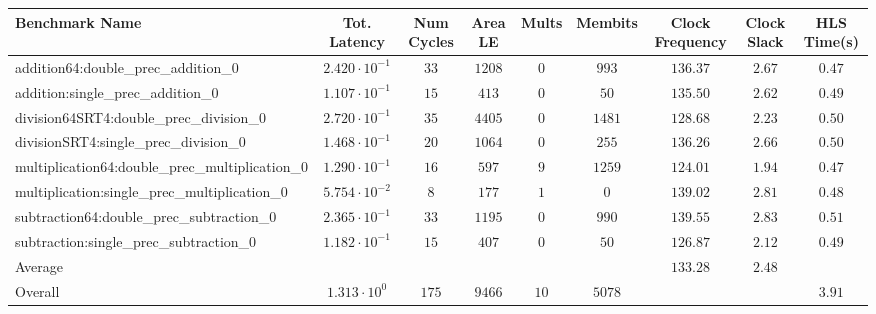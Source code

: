 \begin{tabular}{|l|c|c|c|c|c|c|c|c|}
\hline
Benchmark Name                                   & Tot. Latency            & Num Cycles & Area LE  & Mults  & Membits  & Clock Frequency & Clock Slack & HLS Time(s) \\
\hline
addition64:double\_prec\_addition\_0             & $ 2.420 \cdot 10^{-1} $ & $ 33     $ & $ 1208 $ & $ 0  $ & $ 993  $ & $ 136.37      $ & $ 2.67    $ & $ 0.47    $ \\
addition:single\_prec\_addition\_0               & $ 1.107 \cdot 10^{-1} $ & $ 15     $ & $ 413  $ & $ 0  $ & $ 50   $ & $ 135.50      $ & $ 2.62    $ & $ 0.49    $ \\
division64SRT4:double\_prec\_division\_0         & $ 2.720 \cdot 10^{-1} $ & $ 35     $ & $ 4405 $ & $ 0  $ & $ 1481 $ & $ 128.68      $ & $ 2.23    $ & $ 0.50    $ \\
divisionSRT4:single\_prec\_division\_0           & $ 1.468 \cdot 10^{-1} $ & $ 20     $ & $ 1064 $ & $ 0  $ & $ 255  $ & $ 136.26      $ & $ 2.66    $ & $ 0.50    $ \\
multiplication64:double\_prec\_multiplication\_0 & $ 1.290 \cdot 10^{-1} $ & $ 16     $ & $ 597  $ & $ 9  $ & $ 1259 $ & $ 124.01      $ & $ 1.94    $ & $ 0.47    $ \\
multiplication:single\_prec\_multiplication\_0   & $ 5.754 \cdot 10^{-2} $ & $ 8      $ & $ 177  $ & $ 1  $ & $ 0    $ & $ 139.02      $ & $ 2.81    $ & $ 0.48    $ \\
subtraction64:double\_prec\_subtraction\_0       & $ 2.365 \cdot 10^{-1} $ & $ 33     $ & $ 1195 $ & $ 0  $ & $ 990  $ & $ 139.55      $ & $ 2.83    $ & $ 0.51    $ \\
subtraction:single\_prec\_subtraction\_0         & $ 1.182 \cdot 10^{-1} $ & $ 15     $ & $ 407  $ & $ 0  $ & $ 50   $ & $ 126.87      $ & $ 2.12    $ & $ 0.49    $ \\
\hline
Average                                          & $                     $ & $        $ & $      $ & $    $ & $      $ & $ 133.28      $ & $ 2.48    $ & $         $ \\
\hline
Overall                                          & $ 1.313 \cdot 10^{0}  $ & $ 175    $ & $ 9466 $ & $ 10 $ & $ 5078 $ & $             $ & $         $ & $ 3.91    $ \\
\hline
\end{tabular}
